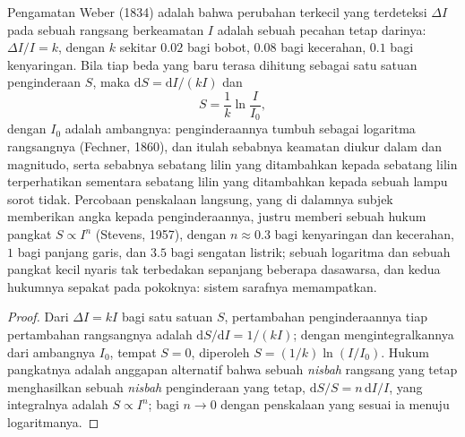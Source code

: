 \begin{theorem}\label{thm:b3:sensory-systems:weber}
Pengamatan Weber (1834) adalah bahwa perubahan terkecil yang terdeteksi
$\Delta I$ pada sebuah rangsang berkeamatan $I$ adalah sebuah pecahan tetap
darinya: $\Delta I/I = k$, dengan $k$ sekitar $0.02$ bagi bobot, $0.08$ bagi
kecerahan, $0.1$ bagi kenyaringan. Bila tiap beda yang baru terasa
dihitung sebagai satu satuan penginderaan $S$, maka $\mathrm{d}S = \mathrm{d}I/
(kI)$ dan
\[
S = \frac{1}{k}\ln\frac{I}{I_{0}} ,
\]
dengan $I_{0}$ adalah ambangnya: penginderaannya tumbuh sebagai logaritma
rangsangnya (Fechner, 1860), dan itulah sebabnya keamatan diukur dalam
 dan magnitudo, serta sebabnya sebatang lilin yang ditambahkan kepada
sebatang lilin terperhatikan sementara sebatang lilin yang ditambahkan kepada
sebuah lampu sorot tidak. Percobaan penskalaan langsung, yang di dalamnya
subjek memberikan angka kepada penginderaannya, justru memberi sebuah hukum
pangkat $S \propto I^{n}$ (Stevens, 1957), dengan $n \approx
0.3$ bagi kenyaringan dan kecerahan, $1$ bagi panjang garis, dan $3.5$ bagi
sengatan listrik; sebuah logaritma dan sebuah pangkat kecil nyaris tak
terbedakan sepanjang beberapa dasawarsa, dan kedua hukumnya sepakat pada
pokoknya: sistem sarafnya memampatkan.
\end{theorem}
\begin{proof}
Dari $\Delta I = kI$ bagi satu satuan $S$, pertambahan penginderaannya
tiap pertambahan rangsangnya adalah $\mathrm{d}S/\mathrm{d}I = 1/(kI)$;
dengan mengintegralkannya dari ambangnya $I_{0}$, tempat $S = 0$, diperoleh $S = (1/k)
\ln(I/I_{0})$. Hukum pangkatnya adalah anggapan alternatif bahwa sebuah
\emph{nisbah} rangsang yang tetap menghasilkan sebuah \emph{nisbah} penginderaan yang tetap,
$\mathrm{d}S/S = n\,\mathrm{d}I/I$, yang integralnya adalah $S \propto I^{n}$;
bagi $n \to 0$ dengan penskalaan yang sesuai ia menuju logaritmanya.
\end{proof}

